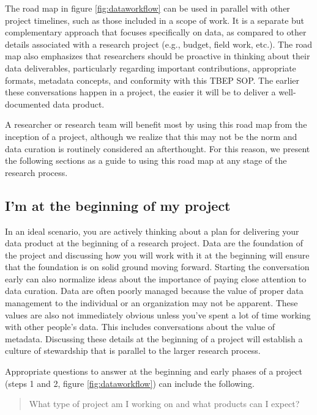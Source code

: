\documentclass[
]{book}
\begin{document}
The road map in figure \ref{fig:dataworkflow} can be used in parallel with other project timelines, such as those included in a scope of work. It is a separate but complementary approach that focuses specifically on data, as compared to other details associated with a research project (e.g., budget, field work, etc.). The road map also emphasizes that researchers should be proactive in thinking about their data deliverables, particularly regarding important contributions, appropriate formats, metadata concepts, and conformity with this TBEP SOP. The earlier these conversations happen in a project, the easier it will be to deliver a well-documented data product.

A researcher or research team will benefit most by using this road map from the inception of a project, although we realize that this may not be the norm and data curation is routinely considered an afterthought. For this reason, we present the following sections as a guide to using this road map at any stage of the research process.

\subsection{I'm at the beginning of my project}\label{beginning}

In an ideal scenario, you are actively thinking about a plan for delivering your data product at the beginning of a research project. Data are the foundation of the project and discussing how you will work with it at the beginning will ensure that the foundation is on solid ground moving forward. Starting the conversation early can also normalize ideas about the importance of paying close attention to data curation. Data are often poorly managed because the value of proper data management to the individual or an organization may not be apparent. These values are also not immediately obvious unless you've spent a lot of time working with other people's data. This includes conversations about the value of metadata. Discussing these details at the beginning of a project will establish a culture of stewardship that is parallel to the larger research process.

Appropriate questions to answer at the beginning and early phases of a project (steps 1 and 2, figure \ref{fig:dataworkflow}) can include the following.

\begin{quote}
What type of project am I working on and what products can I expect?
\end{quote}
\end{document}
